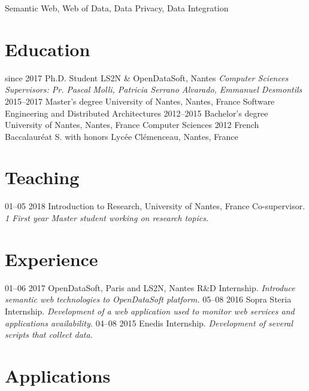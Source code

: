 \documentclass[]{friggeri-cv}
\begin{document}
Semantic Web, Web of Data, Data Privacy, Data Integration

\section{Education}

\begin{entrylist}
  \entry
    {since 2017}
    {Ph.D. Student}
    {LS2N \& OpenDataSoft, Nantes}
    {\emph{Computer Sciences}\\
    \emph{Supervisors: Pr. Pascal Molli, Patricia Serrano Alvarado, Emmanuel Desmontils}}
  \entry
    {2015–2017}
    {Master’s degree}
    {University of Nantes, Nantes, France}
    {Software Engineering and Distributed Architectures}
  \entry
    {2012–2015}
    {Bachelor’s degree}
    {University of Nantes, Nantes, France}
    {Computer Sciences}
  \entry
    {2012}
    {French Baccalauréat S. with honors}
    {Lycée Clémenceau, Nantes, France}
    {}
\end{entrylist}

\section{Teaching}

\begin{entrylist}
  \entry
    {01–05 2018}
    {Introduction to Research, University of Nantes, France}
    {Co-supervisor.}
    {\emph{1 First year Master student working on research topics.}}
 \end{entrylist}

\section{Experience}

\begin{entrylist}
  \entry
    {01–06 2017}
    {OpenDataSoft, Paris and LS2N, Nantes}
    {R\&D Internship.}
    {\emph{Introduce semantic web technologies to OpenDataSoft platform.}}
  \entry
    {05–08 2016}
    {Sopra Steria}
    {Internship.}
    {\emph{Development of a web application used to monitor web services and applications availability.}}
  \entry
    {04–08 2015}
    {Enedis}
    {Internship.}
    {\emph{Development of several scripts that collect data.}}
\end{entrylist}

\section{Applications}
\end{document}
